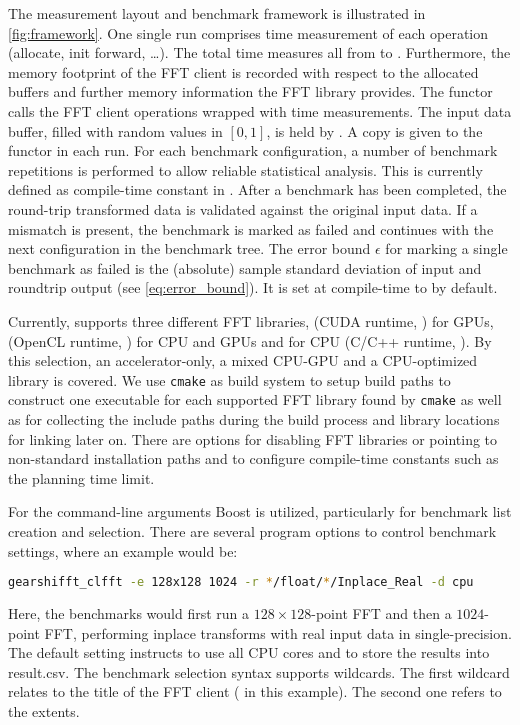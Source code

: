 The measurement layout and benchmark framework is illustrated in \cref{fig:framework}. One single run comprises time measurement of each operation (allocate, init forward, \ldots). The total time measures all from  to . Furthermore, the memory footprint of the FFT client is recorded with respect to the allocated buffers and further memory information the FFT library provides. The functor  calls the FFT client operations wrapped with time measurements. The input data buffer, filled with random values in $[0,1]$, is held by . A copy is given to the  functor in each run. For each benchmark configuration, a number of benchmark repetitions is performed to allow reliable statistical analysis. This is currently defined as compile-time constant in . After a benchmark has been completed, the round-trip transformed data is validated against the original input data. If a mismatch is present, the benchmark is marked as failed and \gearshifft{} continues with the next configuration in the benchmark tree. The error bound $\epsilon$ for marking a single benchmark as failed is the (absolute) sample standard deviation of input and roundtrip output (see \cref{eq:error_bound}). It is set at compile-time to  by default. 

Currently, \gearshifft{} supports three different FFT libraries, \cufft{} (CUDA runtime, \cite{nvidia2010cufft}) for \nvidia{} GPUs, \clfft{} (OpenCL runtime, \cite{clfft}) for CPU and GPUs and \fftw{} for CPU (C/C++ runtime, \cite{FFTW05}). By this selection, an accelerator-only, a mixed CPU-GPU and a CPU-optimized library is covered.
%
We use \texttt{cmake} as build system to setup build paths to construct one executable for each supported FFT library found by \texttt{cmake} as well as for collecting the include paths during the build process and library locations for linking later on. There are options for disabling FFT libraries or pointing to non-standard installation paths and to configure compile-time constants such as the \fftw{} planning time limit. 

For the command-line arguments Boost is utilized, particularly for benchmark list creation and selection.
There are several \gearshifft{} program options to control benchmark settings, where an example would be:
\begin{lstlisting}[language=bash]
gearshifft_clfft -e 128x128 1024 -r */float/*/Inplace_Real -d cpu
\end{lstlisting}
Here, the \clfft{} benchmarks would first run a $128{\times}128$-point FFT and then a $1024$-point FFT, performing inplace transforms with real input data in single-precision. The default setting instructs \gearshifft{} to use all CPU cores and to store the results into result.csv. The \gearshifft{} benchmark selection syntax supports wildcards. The first wildcard \mc{*} relates to the title of the FFT client ( in this example). The second one refers to the extents.
